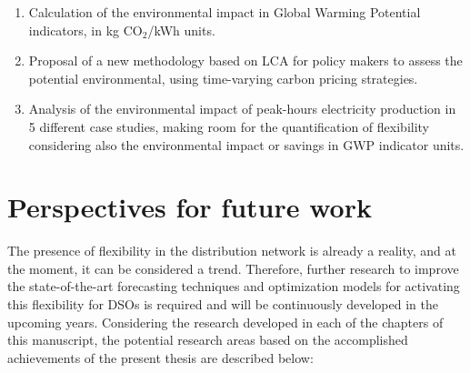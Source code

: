\begin{itemize}
\begin{enumerate}
		\item Calculation of the environmental impact in Global Warming Potential indicators, in kg CO$_2$/kWh units. 
		\item Proposal of a new methodology based on LCA for policy makers to assess the potential environmental, using time-varying carbon pricing strategies. 
		\item Analysis of the environmental impact of peak-hours electricity production in 5 different case studies, making room for the quantification of flexibility considering also the environmental impact or savings in GWP indicator units. 
	\end{enumerate}
\end{itemize}


\section{Perspectives for future work}
The presence of flexibility in the distribution network is already a reality, and at the moment, it can be considered a trend. Therefore, further research to improve the state-of-the-art forecasting techniques and optimization models for activating this flexibility for DSOs is required and will be continuously developed in the upcoming years. 
Considering the research developed in each of the chapters of this manuscript, the potential research areas based on the accomplished achievements of the present thesis are described below: 

